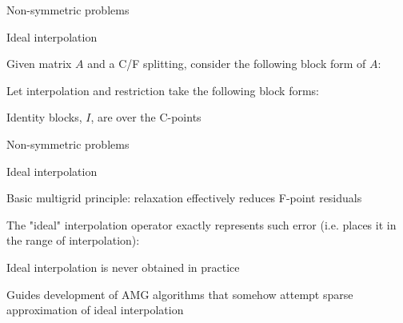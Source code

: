 \documentclass[18pt,xcolor=table]{beamer}
\begin{document}
\begin{frame}{Non-symmetric problems}
\begin{block}{Ideal interpolation}
\bit
\item Given matrix $A$ and a C/F splitting, consider the following block form of $A$:
\item Let interpolation and restriction take the following block forms:
\item Identity blocks, $I$, are over the C-points
\eit
\end{block}
\end{frame}

\begin{frame}{Non-symmetric problems}
\begin{block}{Ideal interpolation}
\bit
\item Basic multigrid principle: relaxation effectively reduces F-point residuals
\item The "ideal" interpolation operator exactly represents such error (i.e. places it in the range of interpolation):
\item Ideal interpolation is never obtained in practice
\item Guides development of AMG algorithms that somehow attempt sparse approximation of ideal interpolation
\eit
\end{block}
\end{frame}
\end{document}
